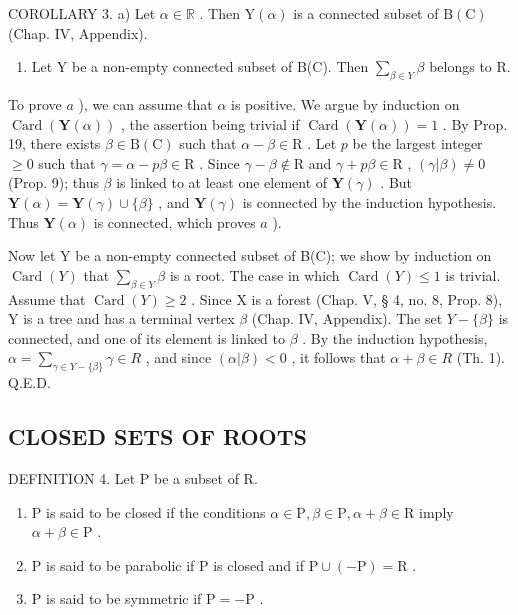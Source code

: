COROLLARY 3. a) Let \(\alpha \in \mathbb{R}\) . Then \(\mathrm{Y}(\alpha)\) is a connected subset of \(\mathrm{B}(\mathrm{C})\) (Chap. IV, Appendix).

\begin{enumerate}
\def\labelenumi{\alph{enumi})}
\setcounter{enumi}{1}
\tightlist
\item
  Let Y be a non-empty connected subset of B(C). Then \(\sum_{\beta\in Y}\beta\) belongs to R.
\end{enumerate}

To prove \(a\) ), we can assume that \(\alpha\) is positive. We argue by induction on \(\operatorname{Card}(\mathbf{Y}(\alpha))\) , the assertion being trivial if \(\operatorname{Card}(\mathbf{Y}(\alpha)) = 1\) . By Prop. 19, there exists \(\beta \in \mathrm{B}(\mathrm{C})\) such that \(\alpha - \beta \in \mathrm{R}\) . Let \(p\) be the largest integer \(\geqslant 0\) such that \(\gamma = \alpha - p\beta \in \mathrm{R}\) . Since \(\gamma - \beta \notin \mathrm{R}\) and \(\gamma + p\beta \in \mathrm{R}\) , \((\gamma|\beta) \neq 0\) (Prop. 9); thus \(\beta\) is linked to at least one element of \(\mathbf{Y}(\gamma)\) . But \(\mathbf{Y}(\alpha) = \mathbf{Y}(\gamma) \cup \{\beta\}\) , and \(\mathbf{Y}(\gamma)\) is connected by the induction hypothesis. Thus \(\mathbf{Y}(\alpha)\) is connected, which proves \(a\) ).

Now let Y be a non-empty connected subset of B(C); we show by induction on \(\operatorname{Card}(Y)\) that \(\sum_{\beta\in Y}\beta\) is a root. The case in which \(\operatorname{Card}(Y)\leqslant1\) is trivial. Assume that \(\operatorname{Card}(Y)\geqslant2\) . Since X is a forest (Chap. V, § 4, no. 8, Prop. 8), Y is a tree and has a terminal vertex \(\beta\) (Chap. IV, Appendix). The set \(Y-\{\beta\}\) is connected, and one of its element is linked to \(\beta\) . By the induction hypothesis, \(\alpha=\sum_{\gamma\in Y-\{\beta\}}\gamma\in R\) , and since \((\alpha|\beta)<0\) , it follows that \(\alpha+\beta\in R\) (Th. 1). Q.E.D.

\subsection{CLOSED SETS OF ROOTS}

DEFINITION 4. Let P be a subset of R.

\begin{enumerate}
\def\labelenumi{(\roman{enumi})}
\item
  P is said to be closed if the conditions \(\alpha \in \mathrm{P},\beta \in \mathrm{P},\alpha +\beta \in \mathrm{R}\) imply \(\alpha +\beta \in \mathrm{P}\) .
\item
  P is said to be parabolic if P is closed and if \(\mathrm{P} \cup (-\mathrm{P}) = \mathrm{R}\) .
\item
  P is said to be symmetric if \(\mathrm{P} = -\mathrm{P}\) .
\end{enumerate}

